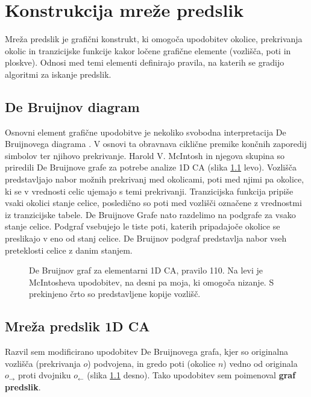 \documentclass[12pt,a4paper,openany,twoside]{book}
\begin{document}
\chapter{Konstrukcija mreže predslik}

Mreža predslik je grafični konstrukt, ki omogoča upodobitev
okolice, prekrivanja okolic in tranzicijske funkcije
kakor ločene grafične elemente (vozlišča, poti in ploskve).
Odnosi med temi elementi definirajo pravila,
na katerih se gradijo algoritmi za iskanje predslik.

\section{De Bruijnov diagram}

Osnovni element grafične upodobitve je nekoliko svobodna interpretacija De Bruijnovega diagrama \cite{WikiDeBruijn}.
V osnovi ta obravnava ciklične premike končnih zaporedij simbolov ter njihovo prekrivanje.
Harold V. McIntosh \cite{McIntosh1991} in njegova skupina \cite{Soto2008}
so priredili De Bruijnove grafe za potrebe analize 1D CA (slika \ref{de_bruijn_diagram} levo).
Vozlišča predstavljajo nabor možnih prekrivanj med okolicami,
poti med njimi pa okolice, ki se v vrednosti celic ujemajo s temi prekrivanji.
Tranzicijska funkcija pripiše vsaki okolici stanje celice,
posledično so poti med vozlišči označene z vrednostmi iz tranzicijske tabele.
De Bruijnove Grafe nato razdelimo na podgrafe za vsako stanje celice.
Podgraf vsebujejo le tiste poti, katerih pripadajoče okolice se preslikajo v eno od stanj celice.
De Bruijnov podgraf predstavlja nabor vseh preteklosti celice z danim stanjem.

\begin{figure}[htb]
\centerline{}
\caption[De Bruijnov graf, pravilo 110.]
{De Bruijnov graf za elementarni 1D CA, pravilo 110.
Na levi je McIntosheva upodobitev, na desni pa moja, ki omogoča nizanje.
S prekinjeno črto so predstavljene kopije vozlišč.}
\label{de_bruijn_diagram}
\end{figure}

\section{Mreža predslik 1D CA}

Razvil sem \cite{JerasDobnikar2007} modificirano upodobitev De Bruijnovega grafa,
kjer so originalna vozlišča (prekrivanja \(o\)) podvojena,
in gredo poti (okolice \(n\)) vedno od originala \(o_{\rightarrow}\)
proti dvojniku \(o_{\leftarrow}\) (slika \ref{de_bruijn_diagram} desno).
Tako upodobitev sem poimenoval \textbf{graf predslik}.
\end{document}
